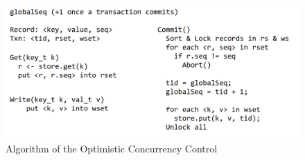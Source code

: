 \begin{figure}
    \centering
    \includegraphics[width=0.36\paperwidth]{USENIX/figure/algorithm.png}
    \caption{Algorithm of the Optimistic Concurrency Control}
    \label{fig:OCCValidation}
\end{figure}